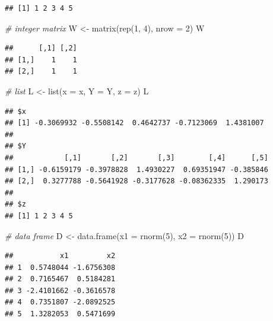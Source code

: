 \documentclass[
]{book}
\newenvironment{Shaded}{\begin{snugshade}}{\end{snugshade}}
\newcommand{\AttributeTok}[1]{\textcolor[rgb]{0.77,0.63,0.00}{#1}}
\newcommand{\CommentTok}[1]{\textcolor[rgb]{0.56,0.35,0.01}{\textit{#1}}}
\newcommand{\DecValTok}[1]{\textcolor[rgb]{0.00,0.00,0.81}{#1}}
\newcommand{\FunctionTok}[1]{\textcolor[rgb]{0.00,0.00,0.00}{#1}}
\newcommand{\NormalTok}[1]{#1}
\newcommand{\OtherTok}[1]{\textcolor[rgb]{0.56,0.35,0.01}{#1}}
\begin{document}
\begin{verbatim}
## [1] 1 2 3 4 5
\end{verbatim}

\begin{Shaded}
\begin{Highlighting}[]
\CommentTok{\# integer matrix}
\NormalTok{W }\OtherTok{\textless{}{-}} \FunctionTok{matrix}\NormalTok{(}\FunctionTok{rep}\NormalTok{(}\DecValTok{1}\NormalTok{, }\DecValTok{4}\NormalTok{), }\AttributeTok{nrow =} \DecValTok{2}\NormalTok{)}
\NormalTok{W}
\end{Highlighting}
\end{Shaded}

\begin{verbatim}
##      [,1] [,2]
## [1,]    1    1
## [2,]    1    1
\end{verbatim}

\begin{Shaded}
\begin{Highlighting}[]
\CommentTok{\# list}
\NormalTok{L }\OtherTok{\textless{}{-}} \FunctionTok{list}\NormalTok{(}\AttributeTok{x =}\NormalTok{ x, }\AttributeTok{Y =}\NormalTok{ Y, }\AttributeTok{z =}\NormalTok{ z)}
\NormalTok{L}
\end{Highlighting}
\end{Shaded}

\begin{verbatim}
## $x
## [1] -0.3069932 -0.5508142  0.4642737 -0.7123069  1.4381007
## 
## $Y
##            [,1]       [,2]       [,3]        [,4]      [,5]
## [1,] -0.6159179 -0.3978828  1.4930227  0.69351947 -0.385846
## [2,]  0.3277788 -0.5641928 -0.3177628 -0.08362335  1.290173
## 
## $z
## [1] 1 2 3 4 5
\end{verbatim}

\begin{Shaded}
\begin{Highlighting}[]
\CommentTok{\# data frame}
\NormalTok{D }\OtherTok{\textless{}{-}} \FunctionTok{data.frame}\NormalTok{(}\AttributeTok{x1 =} \FunctionTok{rnorm}\NormalTok{(}\DecValTok{5}\NormalTok{), }\AttributeTok{x2 =} \FunctionTok{rnorm}\NormalTok{(}\DecValTok{5}\NormalTok{))}
\NormalTok{D}
\end{Highlighting}
\end{Shaded}

\begin{verbatim}
##           x1         x2
## 1  0.5748044 -1.6756308
## 2  0.7165467  0.5184281
## 3 -2.4101662 -0.3616578
## 4  0.7351807 -2.0892525
## 5  1.3282053  0.5471699
\end{verbatim}
\end{document}

